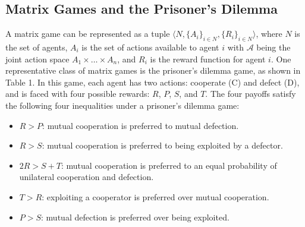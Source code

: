\documentclass{article}
\begin{document}
\subsection{Matrix Games and the Prisoner's Dilemma}
\begin{comment}
A matrix game can be represented as a tuple $ \langle N, \{A_i\}_{i \in N},\{R_i\}_{i \in N} \rangle$, where $N$ is the set of agents, $A_i$ is the set of actions available to agent $i$ with $\mathcal{A}$ being the joint action space $A_1 \times \ldots \times A_n$, and $R_i$ is the reward function for agent $i$. One representative class of matrix games is the prisoner's dilemma game, as shown in Table 1. In this game, each agent has two actions: cooperate (C) and defect (D), and is faced with four possible rewards: $R$ (reward of mutual cooperation), $P$ (punishment of mutual defection), $S$ (sucker outcome obtained by by cooperating against a defector), $T$ (temptation outcome received by defecting against a cooperator). The four payoffs satisfy the following four inequalities under a prisoner's dilemma game:
\begin{itemize}
\item $R > P$: mutual cooperation is preferred to mutual defection.
\item $R > S$: mutual cooperation is preferred to being exploited by a defector.
\item $2R > S + T$: mutual cooperation is preferred to an equal probability of unilateral cooperation and defection.
\item $T > R$: exploiting a cooperator is preferred over mutual cooperation.
\item $P > S$: mutual defection is preferred over being exploited.
\end{itemize}
\end{comment}

A matrix game can be represented as a tuple $ \langle N, \{A_i\}_{i \in N},\{R_i\}_{i \in N} \rangle$, where $N$ is the set of agents, $A_i$ is the set of actions available to agent $i$ with $\mathcal{A}$ being the joint action space $A_1 \times \ldots \times A_n$, and $R_i$ is the reward function for agent $i$. One representative class of matrix games is the prisoner's dilemma game, as shown in Table 1. In this game, each agent has two actions: cooperate (C) and defect (D), and is faced with four possible rewards: $R$, $P$, $S$, and $T$. The four payoffs satisfy the following four inequalities under a prisoner's dilemma game:
\begin{itemize}
\item $R > P$: mutual cooperation is preferred to mutual defection.
\item $R > S$: mutual cooperation is preferred to being exploited by a defector.
\item $2R > S + T$: mutual cooperation is preferred to an equal probability of unilateral cooperation and defection.
\item $T > R$: exploiting a cooperator is preferred over mutual cooperation.
\item $P > S$: mutual defection is preferred over being exploited.
\end{itemize}
\end{document}
